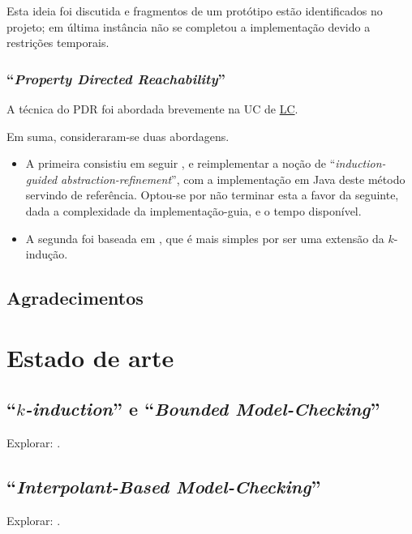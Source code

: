 \documentclass[11pt,a4paper]{report}%
\def\pdr{``\textit{Property Directed Reachability}''\xspace}
\def\bmc{``\textit{Bounded Model-Checking}''\xspace}
\def\imc{``\textit{Interpolant-Based Model-Checking}''\xspace}
\def\kind{``\textit{$k$-induction}''\xspace}
\begin{document}
Esta ideia foi discutida e fragmentos de um protótipo estão identificados no projeto; em última instância
não se completou a implementação devido a restrições temporais.

\subsection{\pdr}

A técnica do PDR foi abordada brevemente na UC de \href{https://paper.dropbox.com/doc/Capitulo-3-Satisfiability-Modulo-Theories-2-Parte-zorZj2G3ceOIi92zrE0n1#:uid=529328955569390400002306&h2=\%E2\%8\0\%9CProperty-Directed-Reachabilit}{LC}.

Em suma, consideraram-se duas abordagens.

\begin{itemize}
    \item A primeira consistiu em seguir \cite{ctigar}, e reimplementar a noção de
    ``\textit{induction-guided abstraction-refinement}'', com a implementação em Java
    deste método servindo de referência.
    Optou-se por não terminar esta a favor da seguinte, dada a complexidade da implementação-guia,
    e o tempo disponível.
    \item A segunda foi baseada em \cite{pdrverification}, que é mais simples por ser uma extensão
    da $k$-indução.
\end{itemize}

\section{Agradecimentos}

\chapter{Estado de arte} \label{chap:state_of_the_art} %

\section*{\kind e \bmc}

Explorar: \cite{bmc} \cite{kind}.

\section*{\imc}

Explorar: \cite{interpolation1} \cite{interpolation2} \cite{ctigar}.
\end{document}
